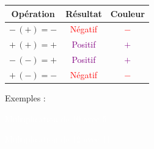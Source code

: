 \documentclass{article}
\begin{document}
\vspace{0.2cm}

\begin{tcolorbox}[colback=lightblue, colframe=navyblue, title=\textcolor{white}{Relations de Signes}, sharp corners=southwest]
\centering
\begin{tabular}{|c|c|c|}
\hline
\textbf{Opération} & \textbf{Résultat} & \textbf{Couleur} \\
\hline
\cellcolor{lightgray} \(- \, (+) = -\) & \textcolor{red}{Négatif} & \textcolor{red}{\(-\)} \\
\hline
\cellcolor{lightblue} \(+ \, (+) = +\) & \textcolor{purple}{Positif} & \textcolor{purple}{\(+\)} \\
\hline
\cellcolor{lightgray} \(- \, (-) = +\) & \textcolor{purple}{Positif} & \textcolor{purple}{\(+\)} \\
\hline
\cellcolor{lightblue} \(+ \, (-) = -\) & \textcolor{red}{Négatif} & \textcolor{red}{\(-\)} \\
\hline
\end{tabular}
\end{tcolorbox}

\vspace{0.2cm}

Exemples :

\begin{tcolorbox}[colback=cyan!10!white, colframe=orange!75!black, title=\textcolor{white}{Multiplications}, sharp corners=southwest]
\centering
\begin{minipage}{0.45\textwidth}
\centering
\textcolor{white}{Multiplication de 10 avec 5} \\
\end{minipage}%
\hfill
\begin{minipage}{0.45\textwidth}
\centering
\textcolor{white}{Multiplication de 12 avec 11} \\
\end{minipage}
\end{tcolorbox}
\end{document}
